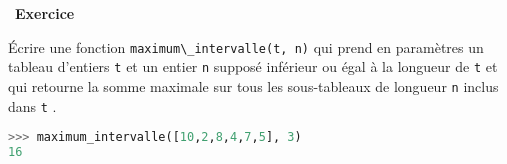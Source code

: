 \documentclass[
  11pt,
]{article}
\newcommand{\passthrough}[1]{#1}
\newcounter{exo}
\newenvironment{exercice}[1]
{\par \medskip   \addtocounter{exo}{1} \noindent  
\begin{bclogo}[arrondi =0.1,   noborder = true, logo=\bccrayon, marge=4]{~\textbf{Exercice} \textbf{\theexo} {\itshape #1} }  \par}
{
\end{bclogo}
 \par \bigskip }
\begin{document}
\begin{exercice}{}

Écrire une fonction \passthrough{\lstinline!maximum\_intervalle(t, n)!}
qui prend en paramètres un tableau d'entiers \passthrough{\lstinline!t!}
et un entier \passthrough{\lstinline!n!} supposé inférieur ou égal à la
longueur de \passthrough{\lstinline!t!} et qui retourne la somme
maximale sur tous les sous-tableaux de longueur
\passthrough{\lstinline!n!} inclus dans \passthrough{\lstinline!t!} .

\begin{lstlisting}[language=Python]
>>> maximum_intervalle([10,2,8,4,7,5], 3)
16
\end{lstlisting}

\end{exercice}
\end{document}
